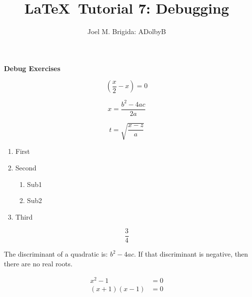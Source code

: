 \documentclass[11pt, letterpaper]{article}
\title{\LaTeX\ Tutorial 7: Debugging}
\author{Joel M. Brigida: ADolbyB}
\date{} %
\begin{document}
\maketitle
\thispagestyle{empty} %

\pagebreak
\setcounter{page}{1} %
\begin{center}
    \textbf{Debug Exercises}
\end{center}

$$\left( \frac{x}{2} - x \right) = 0$$ %

$$x = \frac{b^2-4ac}{2a}$$ %

$$t = \sqrt{\frac{x-z}{a}}$$ %

\begin{enumerate}
\item First
\item Second
	\begin{enumerate}
	\item Sub1
	\item Sub2
    \end{enumerate} %
\item Third
\end{enumerate}

$$\frac{3}{4}$$ %

The discriminant of a quadratic is: $b^2 - 4ac$.  If that discriminant
is negative, then there are no real roots.

\begin{align*} %
    x^2-1 &=0 \\ %
    (x+1)(x-1) &= 0
\end{align*} %
\end{document}
